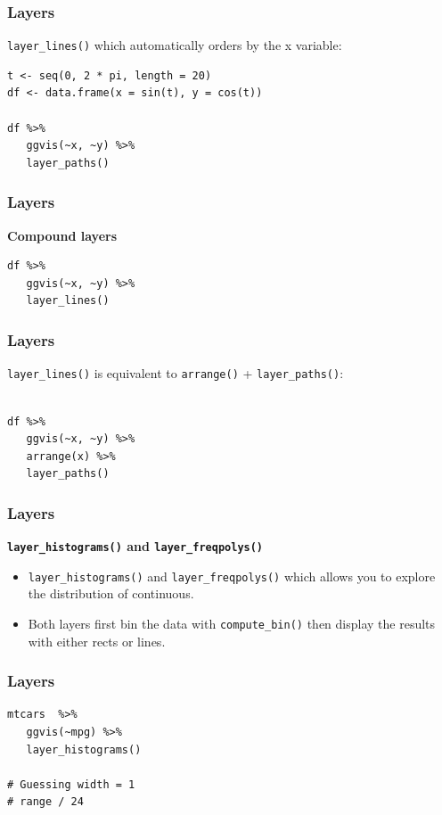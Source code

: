 \documentclass[MASTER.tex]{subfiles}
\begin{document}
\begin{frame}[fragile]
	\frametitle{Layers}
	\Large
\texttt{layer\_lines()} which automatically orders by the x variable:
	\begin{framed}
		\begin{verbatim}
t <- seq(0, 2 * pi, length = 20)
df <- data.frame(x = sin(t), y = cos(t))

df %>% 
   ggvis(~x, ~y) %>% 
   layer_paths()
\end{verbatim}
\end{framed}
\end{frame}
\begin{frame}[fragile]
\frametitle{Layers}
\Large
\textbf{Compound layers}\\
	\begin{framed}
		\begin{verbatim}
df %>% 
   ggvis(~x, ~y) %>% 
   layer_lines()
\end{verbatim}
\end{framed}
\end{frame}
\begin{frame}[fragile]
\frametitle{Layers}
\Large
\texttt{layer\_lines()} is equivalent to \texttt{arrange()} + \texttt{layer\_paths()}:
\Large
\begin{framed}
\begin{verbatim}
 
df %>% 
   ggvis(~x, ~y) %>% 
   arrange(x) %>% 
   layer_paths()
\end{verbatim}
\end{framed}
\end{frame}
\begin{frame}[fragile]
\frametitle{Layers}
\Large
\textbf{\texttt{layer\_histograms()} and \texttt{layer\_freqpolys()}}
\begin{itemize}
\item \texttt{layer\_histograms()} and \texttt{layer\_freqpolys()} which allows you to explore the distribution of continuous. 
\item Both layers first bin the data with \texttt{compute\_bin()} then display the results with either rects or lines.
\end{itemize}

\end{frame}
\begin{frame}[fragile]
\frametitle{Layers}
\Large

\begin{framed}
\begin{verbatim}
mtcars  %>% 
   ggvis(~mpg) %>% 
   layer_histograms()
   
# Guessing width = 1 
# range / 24
\end{verbatim}
\end{framed}
\end{frame}
\end{document}
